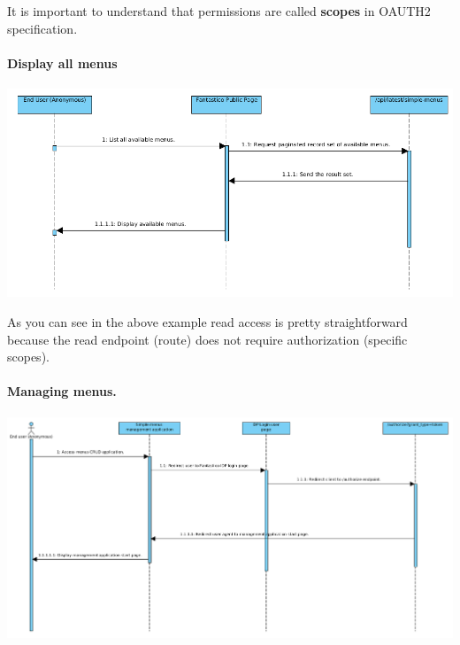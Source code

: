 \documentclass[letterpaper,10pt,english]{sphinxmanual}
\begin{document}
It is important to understand that permissions are called \textbf{scopes} in OAUTH2 specification.


\paragraph{Display all menus}
\label{features/oauth2/simple_api_example:display-all-menus}
\includegraphics{simple_menu_read.png}

As you can see in the above example read access is pretty straightforward because the read endpoint (route) does not require
authorization (specific scopes).


\paragraph{Managing menus.}
\label{features/oauth2/simple_api_example:oauth-create-new-menu}\label{features/oauth2/simple_api_example:managing-menus}
\includegraphics{simple_menu_create.png}
\end{document}
